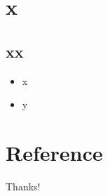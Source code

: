 \documentclass{beamer}
\begin{document}
\section{x}

\subsection{xx}

\begin{frame}
    \begin{itemize}
        \item x
        \item y
    \end{itemize}
\end{frame}




\section{Reference}

\begin{frame}[allowframebreaks]
    
    
\end{frame}

\begin{frame}
    \begin{center}
        {\Huge\calligra Thanks!}
    \end{center}
\end{frame}
\end{document}
